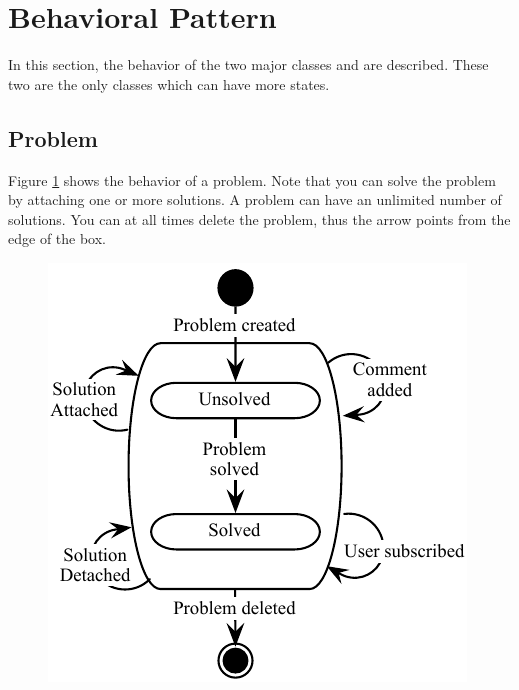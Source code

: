  \section{Behavioral Pattern}
In this section, the behavior of the two major classes  and  are described. 
These two are the only classes which can have more states. 

\subsection{Problem}
\label{sub:problem}
Figure \ref{fig:Klasse_diagram_problem} shows the behavior of a problem. 
Note that you can solve the problem by attaching one or more solutions. 
A problem can have an unlimited number of solutions. 
You can at all times delete the problem, thus the arrow points from the edge of the box.
\begin{figure}[H]
\begin{center}
\includegraphics[scale=1]{input/problem_domain_analysis/Klassediagram_problem.pdf}
\label{fig:Klasse_diagram_problem}
\end{center}
\end{figure}

